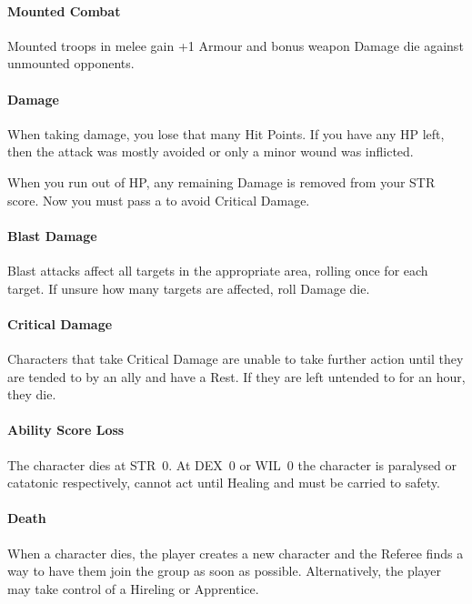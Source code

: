 \documentclass[itdr]{subfiles}
\begin{document}
\vfill
\paragraph{Mounted Combat}

Mounted troops in melee gain +1 Armour and bonus weapon Damage die against unmounted opponents.

\vfill
\paragraph{Damage}
When taking damage, you lose that many Hit Points. If you have any HP left, then the attack was mostly avoided or only a minor wound was inflicted.

When you run out of HP, any remaining Damage is removed from your STR score. Now you must pass a  to avoid Critical Damage.

\vfill
\paragraph{Blast Damage}
Blast attacks affect all targets in the appropriate area, rolling once for each target. If unsure how many targets are affected, roll Damage die.

\vfill
\paragraph{Critical Damage}
Characters that take Critical Damage are unable to take further action until they are tended to by an ally and have a Rest. If they are left untended to for an hour, they die.

\vfill
\paragraph{Ability Score Loss}
The character dies at STR~0. At DEX~0 or WIL~0 the character is paralysed or catatonic respectively, cannot act until Healing and must be carried to safety.

\vfill
\paragraph{Death}
When a character dies, the player creates a new character and the Referee finds a way to have them join the group as soon as possible. Alternatively, the player may take control of a Hireling or Apprentice.
\end{document}

